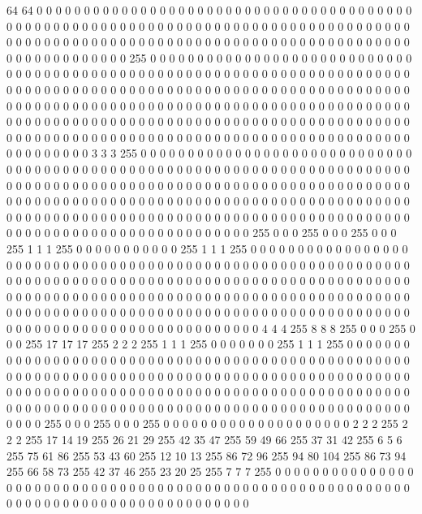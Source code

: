 64 64 0 0 0 0 0 0 0 0 0 0 0 0 0 0 0 0 0 0 0 0 0 0 0 0 0 0 0 0 0 0 0 0 0 0 0 0 0 0 0 0 0 0 0 0 0 0 0 0 0 0 0 0 0 0 0 0 0 0 0 0 0 0 0 0
0 0 0 0 0 0 0 0 0 0 0 0 0 0 0 0 0 0 0 0 0 0 0 0 0 0 0 0 0 0 0 0 0 0 0 0 0 0 0 0 0 0 0 0 0 0 0 0 0 0 0 0 0 0 0 0 0 0 0 0 0 0 0 0
0 0 0 0 0 0 0 0 0 0 0 255 0 0 0 0 0 0 0 0 0 0 0 0 0 0 0 0 0 0 0 0 0 0 0 0 0 0 0 0 0 0 0 0 0 0 0 0 0 0 0 0 0 0 0 0 0 0 0 0 0 0 0 0
0 0 0 0 0 0 0 0 0 0 0 0 0 0 0 0 0 0 0 0 0 0 0 0 0 0 0 0 0 0 0 0 0 0 0 0 0 0 0 0 0 0 0 0 0 0 0 0 0 0 0 0 0 0 0 0 0 0 0 0 0 0 0 0
0 0 0 0 0 0 0 0 0 0 0 0 0 0 0 0 0 0 0 0 0 0 0 0 0 0 0 0 0 0 0 0 0 0 0 0 0 0 0 0 0 0 0 0 0 0 0 0 0 0 0 0 0 0 0 0 0 0 0 0 0 0 0 0
0 0 0 0 0 0 0 0 0 0 0 0 0 0 0 0 0 0 0 0 0 0 0 0 0 0 0 0 0 0 0 0 0 0 0 0 0 0 0 0 0 0 0 0 0 0 0 0 0 0 0 0 0 0 0 0 0 0 0 0 0 0 0 0
0 0 0 0 0 0 0 0 3 3 3 255 0 0 0 0 0 0 0 0 0 0 0 0 0 0 0 0 0 0 0 0 0 0 0 0 0 0 0 0 0 0 0 0 0 0 0 0 0 0 0 0 0 0 0 0 0 0 0 0 0 0 0 0
0 0 0 0 0 0 0 0 0 0 0 0 0 0 0 0 0 0 0 0 0 0 0 0 0 0 0 0 0 0 0 0 0 0 0 0 0 0 0 0 0 0 0 0 0 0 0 0 0 0 0 0 0 0 0 0 0 0 0 0 0 0 0 0
0 0 0 0 0 0 0 0 0 0 0 0 0 0 0 0 0 0 0 0 0 0 0 0 0 0 0 0 0 0 0 0 0 0 0 0 0 0 0 0 0 0 0 0 0 0 0 0 0 0 0 0 0 0 0 0 0 0 0 0 0 0 0 0
0 0 0 0 0 0 0 0 0 0 0 0 0 0 0 0 0 0 0 0 0 0 0 0 0 0 0 0 0 0 0 0 0 0 0 0 0 0 0 0 0 0 0 0 0 0 0 255 0 0 0 255 0 0 0 255 0 0 0 255 1 1 1 255
0 0 0 0 0 0 0 0 0 0 0 255 1 1 1 255 0 0 0 0 0 0 0 0 0 0 0 0 0 0 0 0 0 0 0 0 0 0 0 0 0 0 0 0 0 0 0 0 0 0 0 0 0 0 0 0 0 0 0 0 0 0 0 0
0 0 0 0 0 0 0 0 0 0 0 0 0 0 0 0 0 0 0 0 0 0 0 0 0 0 0 0 0 0 0 0 0 0 0 0 0 0 0 0 0 0 0 0 0 0 0 0 0 0 0 0 0 0 0 0 0 0 0 0 0 0 0 0
0 0 0 0 0 0 0 0 0 0 0 0 0 0 0 0 0 0 0 0 0 0 0 0 0 0 0 0 0 0 0 0 0 0 0 0 0 0 0 0 0 0 0 0 0 0 0 0 0 0 0 0 0 0 0 0 0 0 0 0 0 0 0 0
0 0 0 0 0 0 0 0 0 0 0 0 0 0 0 0 0 0 0 0 0 0 0 0 0 0 0 0 0 0 0 0 0 0 0 0 0 0 0 0 4 4 4 255 8 8 8 255 0 0 0 255 0 0 0 255 17 17 17 255 2 2 2 255
1 1 1 255 0 0 0 0 0 0 0 255 1 1 1 255 0 0 0 0 0 0 0 0 0 0 0 0 0 0 0 0 0 0 0 0 0 0 0 0 0 0 0 0 0 0 0 0 0 0 0 0 0 0 0 0 0 0 0 0 0 0 0 0
0 0 0 0 0 0 0 0 0 0 0 0 0 0 0 0 0 0 0 0 0 0 0 0 0 0 0 0 0 0 0 0 0 0 0 0 0 0 0 0 0 0 0 0 0 0 0 0 0 0 0 0 0 0 0 0 0 0 0 0 0 0 0 0
0 0 0 0 0 0 0 0 0 0 0 0 0 0 0 0 0 0 0 0 0 0 0 0 0 0 0 0 0 0 0 0 0 0 0 0 0 0 0 0 0 0 0 0 0 0 0 0 0 0 0 0 0 0 0 0 0 0 0 0 0 0 0 0
0 0 0 0 0 0 0 255 0 0 0 255 0 0 0 255 0 0 0 0 0 0 0 0 0 0 0 0 0 0 0 0 0 0 0 0 2 2 2 255 2 2 2 255 17 14 19 255 26 21 29 255 42 35 47 255 59 49 66 255 37 31 42 255
6 5 6 255 75 61 86 255 53 43 60 255 12 10 13 255 86 72 96 255 94 80 104 255 86 73 94 255 66 58 73 255 42 37 46 255 23 20 25 255 7 7 7 255 0 0 0 0 0 0 0 0 0 0 0 0 0 0 0 0 0 0 0 0
0 0 0 0 0 0 0 0 0 0 0 0 0 0 0 0 0 0 0 0 0 0 0 0 0 0 0 0 0 0 0 0 0 0 0 0 0 0 0 0 0 0 0 0 0 0 0 0 0 0 0 0 0 0 0 0 0 0 0 0 0 0 0 0
